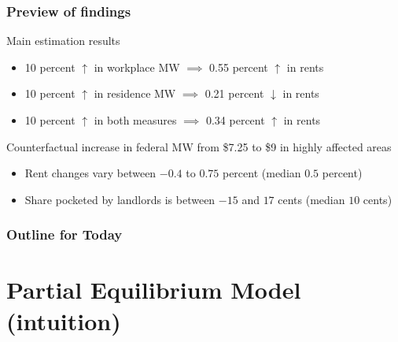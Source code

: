 \documentclass[aspectratio=169, t]{beamer}
\begin{document}
\begin{frame}
    \frametitle{Preview of findings}
    
    Main estimation results
    \begin{itemize}
        \vspace{1mm}
        \item 10 percent $\uparrow$ in {\color{red} workplace MW}
        $\implies$ 0.55 percent $\uparrow$ in rents
        \vspace{1mm}
        \item 10 percent $\uparrow$ in {\color{blue} residence MW}
        $\implies$ 0.21 percent $\downarrow$ in rents
        \vspace{1mm}
        \item 10 percent $\uparrow$ in both measures $\implies$ 0.34 percent $\uparrow$ in rents
    \end{itemize}
    
    \vspace{5mm}
    \pause
    Counterfactual increase in federal MW from \$7.25 to \$9 in highly affected areas
    \begin{itemize}
        \vspace{1mm}
        \item Rent changes vary between $-0.4$ to $0.75$ percent (median $0.5$ percent)
        \vspace{1mm}
        \item Share pocketed by landlords is between $-15$ and $17$ cents (median $10$ cents)
    \end{itemize}
\end{frame}

\begin{frame}
    \frametitle{Outline for Today}
    \tableofcontents[hideallsubsections]
\end{frame}

\section{Partial Equilibrium Model (intuition)}
\end{document}
